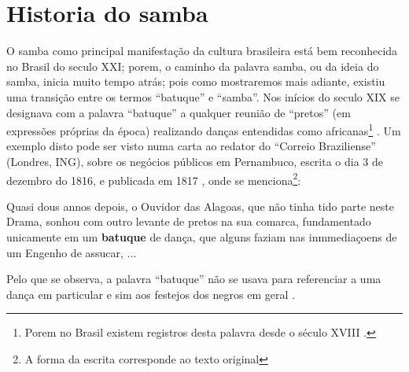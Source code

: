 \section{Historia do samba}
O samba como principal manifestação da cultura brasileira está bem reconhecida no Brasil do seculo XXI;
porem, o caminho da palavra samba, ou da ideia do samba, inicia muito tempo atrás;
pois como mostraremos mais adiante, existiu uma transição entre os termos ``batuque'' e ``samba''.
Nos inícios do seculo XIX
se designava com a palavra ``batuque''  a qualquer reunião de ``pretos'' (em expressões próprias da época) realizando danças entendidas como africanas\footnote{
Porem no Brasil existem registros desta palavra desde o século XVIII \cite[pp. 85]{sandroni2001feitico}. }
\cite[pp. 54]{de4danccas} \cite[pp. 73]{lara2007memoria}.
Um exemplo disto pode ser visto numa carta ao redator do ``Correio Braziliense''  (Londres, ING),
sobre os negócios públicos em Pernambuco,
escrita o dia 3 de dezembro do 1816, e publicada em 1817 \cite[pp. 468]{batuqueBraziliense},
onde se menciona\footnote{\label{footort}A forma da escrita corresponde ao texto original}:
\begin{citando}%
Quasi dous annos depois, o Ouvidor das Alagoas, que não tinha tido parte neste Drama,
sonhou com outro levante de pretos na sua comarca, 
fundamentado unicamente em um \textbf{batuque} de dança, 
que alguns faziam nas inmmediaçoens de um Engenho de assucar, ...
\end{citando} 
Pelo que se observa, 
a palavra ``batuque'' não se usava para referenciar a uma dança em particular e sim aos festejos dos negros em geral \cite[pp. 85]{sandroni2001feitico}.

\PRLsep{*}

